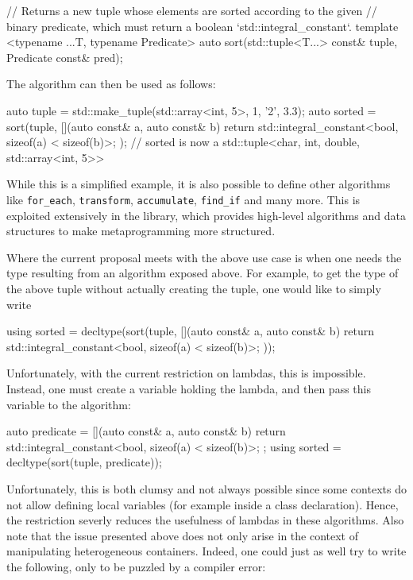 \documentclass{wg21}
\newcommand{\cc}[1]{\texttt{#1}}
\begin{document}
\begin{cpp}
// Returns a new tuple whose elements are sorted according to the given
// binary predicate, which must return a boolean `std::integral_constant`.
template <typename ...T, typename Predicate>
auto sort(std::tuple<T...> const& tuple, Predicate const& pred);
\end{cpp}

The algorithm can then be used as follows:

\begin{cpp}
auto tuple = std::make_tuple(std::array<int, 5>{}, 1, '2', 3.3);
auto sorted = sort(tuple, [](auto const& a, auto const& b) {
  return std::integral_constant<bool, sizeof(a) < sizeof(b)>{};
});
// sorted is now a std::tuple<char, int, double, std::array<int, 5>>
\end{cpp}

While this is a simplified example, it is also possible to define other algorithms
like \cc{for_each}, \cc{transform}, \cc{accumulate}, \cc{find_if} and many more. This
is exploited extensively in the \cite{Boost.Hana} library, which provides high-level
algorithms and data structures to make metaprogramming more structured.

Where the current proposal meets with the above use case is when one needs the type
resulting from an algorithm exposed above. For example, to get the type of the above
tuple without actually creating the tuple, one would like to simply write

\begin{cpp}
using sorted = decltype(sort(tuple, [](auto const& a, auto const& b) {
  return std::integral_constant<bool, sizeof(a) < sizeof(b)>{};
}));
\end{cpp}

Unfortunately, with the current restriction on lambdas, this is impossible.
Instead, one must create a variable holding the lambda, and then pass this
variable to the algorithm:

\begin{cpp}
auto predicate = [](auto const& a, auto const& b) {
  return std::integral_constant<bool, sizeof(a) < sizeof(b)>{};
};
using sorted = decltype(sort(tuple, predicate));
\end{cpp}

Unfortunately, this is both clumsy and not always possible since some contexts
do not allow defining local variables (for example inside a class declaration).
Hence, the restriction severly reduces the usefulness of lambdas in these algorithms.
Also note that the issue presented above does not only arise in the context of
manipulating heterogeneous containers. Indeed, one could just as well try to
write the following, only to be puzzled by a compiler error:
\end{document}
